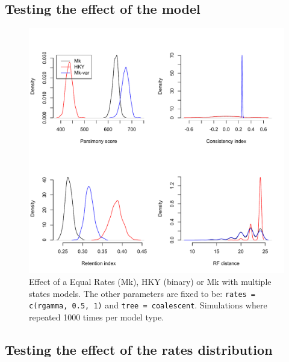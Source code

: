 \documentclass{article}\usepackage[]{graphicx}\usepackage[]{color}
\begin{document}
\subsection{Testing the effect of the model}

\begin{figure}[!htbp]
\centering
   \includegraphics[width=1\textwidth]{Model_effect.pdf}
\caption{Effect of a Equal Rates (Mk), HKY (binary) or Mk with multiple states models.
The other parameters are fixed to be: \texttt{rates = c(rgamma, 0.5, 1)} and \texttt{tree = coalescent}.
Simulations where repeated 1000 times per model type.}
\label{Model_effect}
\end{figure}

\subsection{Testing the effect of the rates distribution}
\end{document}
